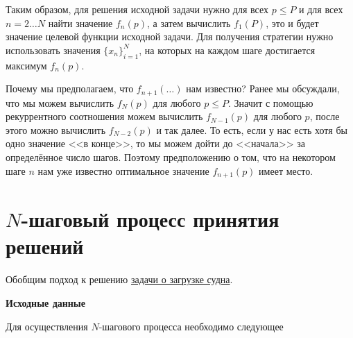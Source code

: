 Таким образом, для решения исходной задачи нужно для всех $p \le P$ и для всех $n = 2 \dots N$ найти значение $f_n(p)$, а затем вычислить $f_1(P)$, это и будет значение целевой функции исходной задачи. Для получения стратегии нужно использовать значения $\{x_n\}_{i=1}^N$, на которых на каждом шаге достигается максимум $f_n(p)$.

\begin{note}
	Почему мы предполагаем, что $f_{n+1}(\dots)$ нам известно? Ранее мы обсуждали, что мы можем вычислить $f_N(p)$ для любого $p \le P$. Значит с помощью рекуррентного соотношения можем вычислить $f_{N-1}(p)$ для любого $p$, после этого можно вычислить $f_{N-2}(p)$ и так далее. То есть, если у нас есть хотя бы одно значение <<в конце>>, то мы можем дойти до <<начала>> за определённое число шагов. Поэтому предположению о том, что на некотором шаге $n$ нам уже известно оптимальное значение $f_{n+1}(p)$ имеет место.
\end{note}

\section{$N$-шаговый процесс принятия решений}

Обобщим подход к решению \hyperref[pr:loading_vessel]{задачи о загрузке судна}.

\label{alg:n_step_process}

\textbf{Исходные данные}

Для осуществления $N$-шагового процесса необходимо следующее

